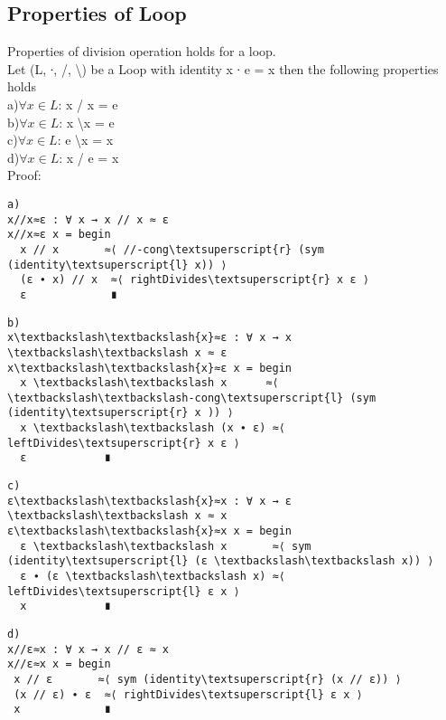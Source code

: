 \subsection{Properties of Loop}
Properties of division operation holds for a loop. \\
Let (L, ∙, /, \textbackslash ) be a Loop with identity x ∙ e = x then the following properties holds \\
a)\(\forall x \in L\): x / x = e \\
b)\(\forall x \in L\):  x \textbackslash x = e\\
c)\(\forall x \in L\): e \textbackslash x = x \\
d)\(\forall x \in L\):  x / e = x \\
Proof:
\begin{center}
\begin{Verbatim}[commandchars=\\\{\},samepage=true]
a)
x//x≈ε : ∀ x → x // x ≈ ε
x//x≈ε x = begin
  x // x       ≈⟨ //-cong\textsuperscript{r} (sym (identity\textsuperscript{l} x)) ⟩
  (ε ∙ x) // x  ≈⟨ rightDivides\textsuperscript{r} x ε ⟩
  ε             ∎
\end{Verbatim}

\begin{Verbatim}[commandchars=\\\{\},samepage=true]
b)
x\textbackslash\textbackslash{x}≈ε : ∀ x → x \textbackslash\textbackslash x ≈ ε
x\textbackslash\textbackslash{x}≈ε x = begin
  x \textbackslash\textbackslash x      ≈⟨ \textbackslash\textbackslash-cong\textsuperscript{l} (sym (identity\textsuperscript{r} x )) ⟩
  x \textbackslash\textbackslash (x ∙ ε) ≈⟨ leftDivides\textsuperscript{r} x ε ⟩
  ε            ∎
\end{Verbatim}
\begin{Verbatim}[commandchars=\\\{\},samepage=true]
c)
ε\textbackslash\textbackslash{x}≈x : ∀ x → ε \textbackslash\textbackslash x ≈ x
ε\textbackslash\textbackslash{x}≈x x = begin
  ε \textbackslash\textbackslash x       ≈⟨ sym (identity\textsuperscript{l} (ε \textbackslash\textbackslash x)) ⟩
  ε ∙ (ε \textbackslash\textbackslash x) ≈⟨ leftDivides\textsuperscript{l} ε x ⟩
  x            ∎
\end{Verbatim}

\begin{Verbatim}[commandchars=\\\{\},samepage=true]
d)
x//ε≈x : ∀ x → x // ε ≈ x
x//ε≈x x = begin
 x // ε       ≈⟨ sym (identity\textsuperscript{r} (x // ε)) ⟩
 (x // ε) ∙ ε  ≈⟨ rightDivides\textsuperscript{l} ε x ⟩
 x             ∎

\end{Verbatim}
\end{center}
